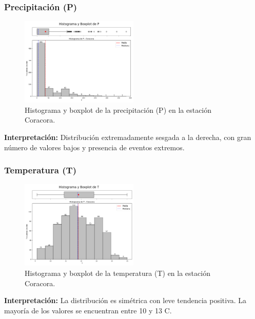 \subsubsection*{Precipitación (P)}
\begin{figure}[H]
\centering
\includegraphics[width=0.5\textwidth]{resultados/por_estacion_meteorologica/Coracora/P_histograma.png}
\caption{Histograma y boxplot de la precipitación (P) en la estación Coracora.}
\label{fig:coracora_P}
\end{figure}
\textbf{Interpretación:} Distribución extremadamente sesgada a la derecha, con gran número de valores bajos y presencia de eventos extremos.

\subsubsection*{Temperatura (T)}
\begin{figure}[H]
\centering
\includegraphics[width=0.5\textwidth]{resultados/por_estacion_meteorologica/Coracora/T_histograma.png}
\caption{Histograma y boxplot de la temperatura (T) en la estación Coracora.}
\label{fig:coracora_T}
\end{figure}
\textbf{Interpretación:} La distribución es simétrica con leve tendencia positiva. La mayoría de los valores se encuentran entre 10 y 13 \textdegree C.

